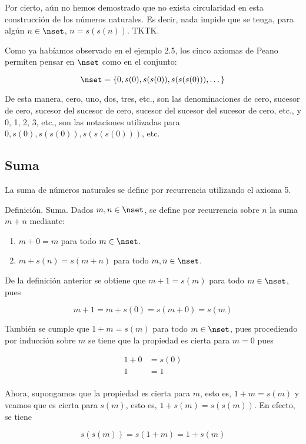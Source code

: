 Por cierto, aún no hemos demostrado que no exista circularidad en esta
construcción de los números naturales. Es decir, nada impide que se tenga,
para algún $n \in \nset$, $n = s(s(n))$. TKTK.

Como ya habíamos observado en el ejemplo 2.5, los cinco axiomas de Peano
permiten pensar en $\nset$ como en el conjunto:

$$ \nset = \left\{ 0, s(0), s(s(0)), s(s(s(0))), \dots \right\} $$

De esta manera, cero, uno, dos, tres, etc., son las denominaciones de cero,
sucesor de cero, sucesor del sucesor de cero, sucesor del sucesor del
sucesor de cero, etc., y 0, 1, 2, 3, etc., son las notaciones utilizadas
para \(0, s(0), s(s(0)), s(s(s(0)))\), etc.





\subsection{Suma}

La suma de números naturales se define por recurrencia utilizando el axioma
5.

Definición. Suma. Dados $m, n \in \nset$, se define por recurrencia sobre
$n$ la suma $m + n$ mediante:

\begin{enumerate}
  \item $m + 0 = m$ para todo $m \in \nset$.
  \item $m + s(n) = s(m + n)$ para todo $m, n \in \nset$.
\end{enumerate}

De la definición anterior se obtiene que $m + 1 = s(m)$ para todo $m \in
\nset$, pues

$$ m + 1 = m + s(0) = s(m + 0) = s(m) $$

También se cumple que $1 + m = s(m)$ para todo $m \in \nset$, pues
procediendo por inducción sobre $m$ se tiene que la propiedad es cierta para
$m = 0$ pues

\begin{align*}
  1 + 0 &= s(0) \\
  1 &= 1 \\
\end{align*}

Ahora, supongamos que la propiedad es cierta para $m$, esto es, $1 + m =
s(m)$ y veamos que es cierta para $s(m)$, esto es, $1 + s(m) = s(s(m))$. En
efecto, se tiene

$$ s(s(m)) = s(1 + m) = 1 + s(m) $$

